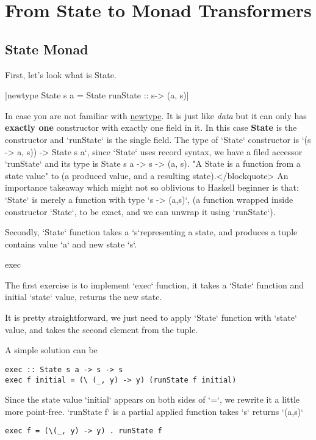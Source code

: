 \chapter{From State to Monad Transformers}

\section{State Monad}

First, let's look what is State.

|newtype State s a = State { runState :: s-> (a, s)}|


In case you are not familiar with \href{https://wiki.haskell.org/Newtype}{newtype}.
It is just like \textit{data} but it can only has \textbf{exactly one} constructor with exactly one field in it. In this case \textbf{State} is the constructor and `runState` is the single field. The type of `State` constructor is `(s ->  a, s)) -> State s a`, since `State` uses record syntax, we have a filed accessor `runState` and its type is State s a -> s -> (a, s).
"A State is a function from a state value" to (a produced value, and a resulting state).</blockquote>
An importance takeaway which might not so oblivious to Haskell beginner is that: `State` is merely a function with type `s -> (a,s)`, (a function wrapped inside constructor `State`, to be exact, and we can unwrap it using `runState`).

Secondly, `State` function takes a `s`representing a state, and produces a tuple contains value `a` and new state `s`.

 exec

The first exercise is to implement `exec` function, it takes a `State` function and initial `state` value, returns the new state.

It is pretty straightforward, we just need to apply `State` function with `state` value, and takes the second  element from the tuple.

A simple solution can be

\begin{verbatim}
exec :: State s a -> s -> s
exec f initial = (\ (_, y) -> y) (runState f initial)
\end{verbatim}

Since the state value `initial` appears on both sides of `=`, we rewrite it a little more point-free. `runState f` is a partial applied function takes `s` returns `(a,s)`

\begin{verbatim}
exec f = (\(_, y) -> y) . runState f
\end{verbatim}

